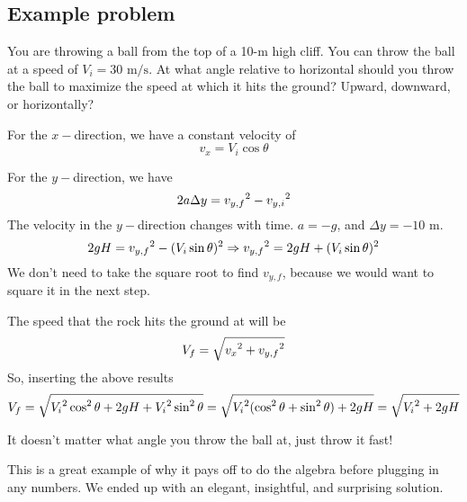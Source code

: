 \subsection{Example problem}

You are throwing a ball from the top of a 10-m high cliff. You can throw the ball at a speed of $V_i=30\mbox{ m/s}$. At what angle relative to horizontal should you throw the ball to maximize the speed at which it hits the ground? Upward, downward, or horizontally?

For the $x-$direction, we have a constant velocity of
$$v_x=V_i\cos\theta$$

For the $y-$direction, we have
$$2a\Delta{y}=v_{y,f}\displaystyle^2-v_{y,i}\displaystyle^2$$
The velocity in the $y-$direction changes with time. $a=-g$, and $\Delta{y}=-10\mbox{ m}$.
$$2gH=v_{y,f}\displaystyle^2-(V_i\sin\theta)\displaystyle^2\Rightarrow v_{y,f}\displaystyle^2=2gH+(V_i\sin\theta)\displaystyle^2$$
We don't need to take the square root to find $v_{y,f}$, because we would want to square it in the next step.

The speed that the rock hits the ground at will be
$$V_f=\sqrt{v_x\displaystyle^2+v_{y,f}\displaystyle^2}$$
So, inserting the above results
$$V_f=\sqrt{V_i\displaystyle^2\cos^2\theta+2gH+V_i\displaystyle^2\sin^2\theta}=\sqrt{V_i\displaystyle^2(\cos^2\theta+\sin^2\theta)+2gH} = \sqrt{V_i\displaystyle^2+2gH}$$

It doesn't matter what angle you throw the ball at, just throw it fast!

This is a great example of why it pays off to do the algebra before plugging in any numbers. We ended up with an elegant, insightful, and surprising solution.


\clearpage
